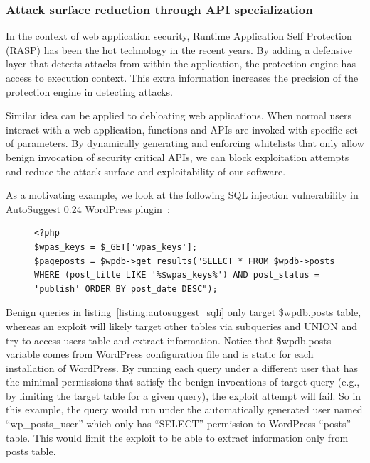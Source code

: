 \subsubsection{Attack surface reduction through API specialization}
In the context of web application security, Runtime Application Self Protection (RASP) has been the hot technology in the recent years. By adding a defensive layer that detects attacks from within the application, the protection engine has access to execution context. This extra information increases the precision of the protection engine in detecting attacks.

Similar idea can be applied to debloating web applications. When normal users interact with a web application, functions and APIs are invoked with specific set of parameters. By dynamically generating and enforcing whitelists that only allow benign invocation of security critical APIs, we can block exploitation attempts and reduce the attack surface and exploitability of our software.

As a motivating example, we look at the following SQL injection vulnerability in AutoSuggest 0.24 WordPress plugin~\cite{autosuggest_vulnerability}:

\begin{figure}[t]
\begin{lstlisting}[frame=single, caption={PHP code from AutoSuggest WordPress plugin with SQL injection vulnerability},captionpos=b, label={listing:autosuggest_sqli}]
<?php
$wpas_keys = $_GET['wpas_keys'];
$pageposts = $wpdb->get_results("SELECT * FROM $wpdb->posts
WHERE (post_title LIKE '%$wpas_keys%') AND post_status = 'publish' ORDER BY post_date DESC");
\end{lstlisting}
\end{figure}

Benign queries in listing~\ref{listing:autosuggest_sqli} only target \$wpdb.posts table, whereas an exploit will likely target other tables via subqueries and UNION and try to access users table and extract information. Notice that \$wpdb.posts variable comes from WordPress configuration file and is static for each installation of WordPress.
By running each query under a different user that has the minimal permissions that satisfy the benign invocations of target query (e.g., by limiting the target table for a given query), the exploit attempt will fail.
So in this example, the query would run under the automatically generated user named ``wp\_posts\_user'' which only has ``SELECT'' permission to WordPress ``posts'' table. This would limit the exploit to be able to extract information only from posts table.

